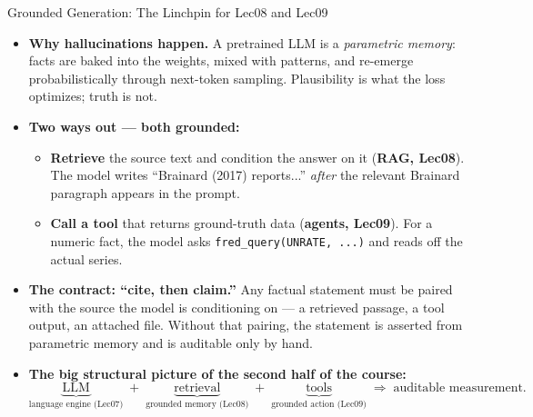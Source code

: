 \begin{frame}{Grounded Generation: The Linchpin for Lec08 and Lec09}
\begin{itemize}
\item \textbf{Why hallucinations happen.} A pretrained LLM is a \emph{parametric memory}: facts are baked into the weights, mixed with patterns, and re-emerge probabilistically through next-token sampling. Plausibility is what the loss optimizes; truth is not.

\medskip
\item \textbf{Two ways out --- both grounded:}
\begin{itemize}
    \item \textbf{Retrieve} the source text and condition the answer on it (\textbf{RAG, Lec08}). The model writes ``Brainard (2017) reports...'' \emph{after} the relevant Brainard paragraph appears in the prompt.
    \item \textbf{Call a tool} that returns ground-truth data (\textbf{agents, Lec09}). For a numeric fact, the model asks \texttt{fred\_query(UNRATE, ...)} and reads off the actual series.
\end{itemize}

\medskip
\item \textbf{The contract: ``cite, then claim.''} Any factual statement must be paired with the source the model is conditioning on --- a retrieved passage, a tool output, an attached file. Without that pairing, the statement is asserted from parametric memory and is auditable only by hand.

\medskip
\item \textbf{The big structural picture of the second half of the course:}
\[
   \underbrace{\text{LLM}}_{\text{language engine (Lec07)}}
   \;+\;\underbrace{\text{retrieval}}_{\text{grounded memory (Lec08)}}
   \;+\;\underbrace{\text{tools}}_{\text{grounded action (Lec09)}}
   \;\Rightarrow\;\text{auditable measurement.}
\]
\end{itemize}
\end{frame}

